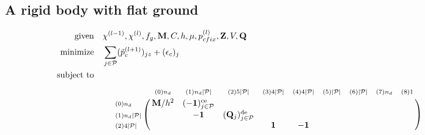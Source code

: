 \documentclass[a4paper,10pt]{article}
\begin{document}
\begin{landscape}
\subsection{A rigid body with flat ground}
\begin{align}
\text{given}      & \quad \chi^{(l-1)}, \chi^{(l)}, f_g, \mathbf{M}, C, h, \mu, p_{cfix}^{(l)}, \mathbf{Z}, V, \mathbf{Q}\notag\\
\text{minimize}   & \quad \sum_{j\in\mathcal{P}} (\tilde{p}_{c}^{(l+1)})_{jz} + (\epsilon_{c})_j \notag\\
\text{subject to} & \quad\quad\quad\quad\quad\quad\quad\quad\quad\quad\quad\quad\quad\quad\quad
\quad\quad\quad\quad\quad\quad\quad\quad\quad\quad\quad\quad\quad\quad\quad
\quad\quad\quad\quad\quad\quad\quad\quad\quad\quad\quad\quad\quad\quad\quad \notag
\end{align}
\begin{equation}\notag
\bordermatrix{
                                    &    \scriptstyle{(0) n_d}                      &              \scriptstyle{(1) n_d |\mathcal{P}|}          &        \scriptstyle{(2) 5 |\mathcal{P}|}       &  \scriptstyle{(3) 4 |\mathcal{P}|}   & \scriptstyle{(4) 4|\mathcal{P}|}    &   \scriptstyle{(5) |\mathcal{P}| }  & \scriptstyle{(6) |\mathcal{P}| }  & \scriptstyle{(7) n_d}  &   \scriptstyle{(8) 1 } \cr
\scriptstyle{(0) n_d}               &  \mathbf{M}/h^2                               & (-\mathbf{1})_{j \in \mathcal{P}}^\text{ce}               &                                                &                                      &                                     &                                     &                                   &                        &                        \cr
\scriptstyle{(1) n_d |\mathcal{P}|} &                                               &  -\mathbf{1}                                              &  (\mathbf{Q}_j)_{j \in \mathcal{P}}^\text{de}  &                                      &                                     &                                     &                                   &                        &                        \cr
\scriptstyle{(2) 4 |\mathcal{P}|}   &                                               &                                                           &                                                &  \mathbf{1}                          &  -\mathbf{1}                        &                                     &                                   &                        &                        \cr
}
\end{equation}
\end{landscape}
\end{document}
